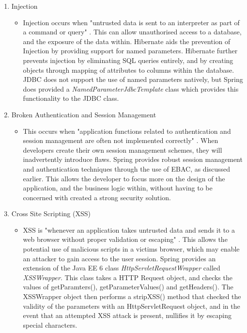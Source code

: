 \begin{enumerate}
\item Injection
\begin{itemize}
\item Injection occurs when "untrusted data is sent to an interpreter as part of a command or query" \parencite{owasp2013}. This can allow unauthorised access to a database, and the exposure of the data within. Hibernate aids the prevention of Injection by providing support for named parameters. Hibernate further prevents injection by eliminating SQL queries entirely, and by creating objects through mapping of attributes to columns within the database. JDBC does not support the use of named parameters natively, but Spring does provided a \textit{NamedParameterJdbcTemplate} class which provides this functionality to the JDBC class. 

\end{itemize}

\item Broken Authentication and Session Management
\begin{itemize}
\item This occurs when "application functions related to authentication and session management are often not implemented correctly" \parencite{owasp2013}. When developers create their own session management schemes, they will inadvertently introduce flaws. Spring provides robust session management and authentication techniques through the use of EBAC, as discussed earlier. This allows the developer to focus more on the design of the application, and the business logic within, without having to be concerned with created a strong security solution.
\end{itemize}

\item Cross Site Scripting (XSS)
\begin{itemize}
\item XSS is "whenever an application takes untrusted data and sends it to a web browser without proper validation or escaping" \parencite{owasp2013}. This allows the potential use of malicious scripts in a victims browser, which may enable an attacker to gain access to the user session. Spring provides an extension of the Java EE 6 class \textit{HttpServletRequestWrapper} called \textit{XSSWrapper}. This class takes a HTTP Request object, and checks the values of getParamters(), getParameterValues() and getHeaders(). The XSSWrapper object then performs a stripXSS() method that checked the validity of the parameters with an HttpServletRequest object, and in the event that an attempted XSS attack is present, nullifies it by escaping special characters.
\end{itemize}


\end{enumerate}
